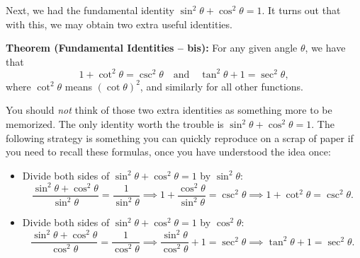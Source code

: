 \documentclass{ximera}
\begin{document}
Next, we had the fundamental identity $\sin^2\theta + \cos^2\theta = 1$. It turns out that with this, we may obtain two extra useful identities.

\begin{callout}
  {\bf Theorem (Fundamental Identities -- bis):} For any given angle $\theta$, we have that $$1 + \cot^2\theta = \csc^2\theta\quad\mbox{and}\quad \tan^2\theta + 1 = \sec^2\theta,$$where $\cot^2\theta$ means $(\cot \theta)^2$, and similarly for all other functions.
\end{callout}

You should \emph{not} think of those two extra identities as something more to be memorized. The only identity worth the trouble is $\sin^2\theta + \cos^2\theta = 1$. The following strategy is something you can quickly reproduce on a scrap of paper if you need to recall these formulas, once you have understood the idea once:

\begin{itemize}
\item Divide both sides of $\sin^2\theta+\cos^2\theta = 1$ by $\sin^2\theta$: $$\frac{\sin^2\theta+\cos^2\theta}{\sin^2\theta} = \frac{1}{\sin^2\theta} \implies1 + \frac{\cos^2\theta}{\sin^2\theta} = \csc^2\theta \implies 1+\cot^2\theta = \csc^2\theta.$$
\item Divide both sides of $\sin^2\theta+\cos^2\theta = 1$ by $\cos^2\theta$:  $$\frac{\sin^2\theta+\cos^2\theta}{\cos^2\theta} = \frac{1}{\cos^2\theta} \implies \frac{\sin^2\theta}{\cos^2\theta} + 1 = \sec^2\theta \implies \tan^2\theta+1=\sec^2\theta.$$
\end{itemize}
\end{document}
